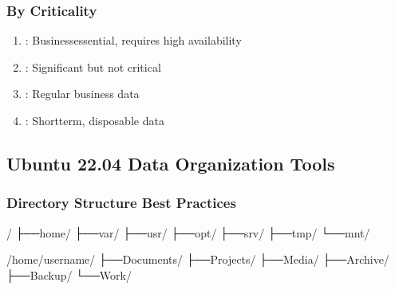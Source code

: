 \documentclass[letterpaper,10pt,english]{sphinxmanual}
\begin{document}
\subsubsection{By Criticality}
\label{\detokenize{data-organization:by-criticality}}\begin{enumerate}
%
\item {} 
\sphinxAtStartPar
{}: Business\sphinxhyphen{}essential, requires high availability

\item {} 
\sphinxAtStartPar
{}: Significant but not critical

\item {} 
\sphinxAtStartPar
{}: Regular business data

\item {} 
\sphinxAtStartPar
{}: Short\sphinxhyphen{}term, disposable data

\end{enumerate}


\subsection{Ubuntu 22.04 Data Organization Tools}
\label{\detokenize{data-organization:ubuntu-22-04-data-organization-tools}}

\subsubsection{Directory Structure Best Practices}
\label{\detokenize{data-organization:directory-structure-best-practices}}
\begin{sphinxVerbatim}[commandchars=\\\{\}]
/
├──home/
├──var/
├──usr/
├──opt/
├──srv/
├──tmp/
└──mnt/

/home/username/
├──Documents/
├──Projects/
├──Media/
├──Archive/
├──Backup/
└──Work/
\end{sphinxVerbatim}
\end{document}
